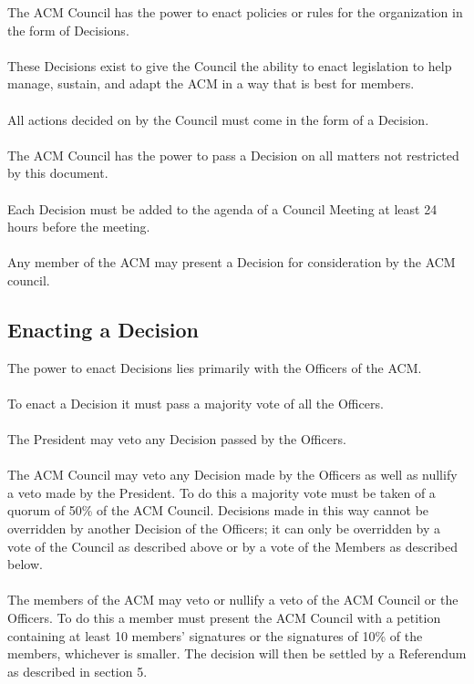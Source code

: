 \documentclass[12pt,titlepage]{article}
\begin{document}
The ACM Council has the power to enact policies or rules for the organization in the form of Decisions.\\
\\
These Decisions exist to give the Council the ability to enact legislation to help manage, sustain, and adapt the ACM in a way that is best for members.\\
\\
All actions decided on by the Council must come in the form of a Decision.\\
\\
The ACM Council has the power to pass a Decision on all matters not restricted by this document.\\
\\
Each Decision must be added to the agenda of a Council Meeting at least 24 hours before the meeting.\\
\\
Any member of the ACM may present a Decision for consideration by the ACM council.

\subsection{Enacting a Decision}

The power to enact Decisions lies primarily with the Officers of the ACM.\\
\\
To enact a Decision it must pass a majority vote of all the Officers.\\
\\
The President may veto any Decision passed by the Officers.\\
\\
The ACM Council may veto any Decision made by the Officers as well as nullify a veto made by the President. To do this a majority vote must be taken of a quorum of 50\% of the ACM Council. Decisions made in this way cannot be overridden by another Decision of the Officers; it can only be overridden by a vote of the Council as described above or by a vote of the Members as described below.\\
\\
The members of the ACM may veto or nullify a veto of the ACM Council or the Officers. To do this a member must present the ACM Council with a petition containing at least 10 members' signatures or the signatures of 10\% of the members, whichever is smaller. The decision will then be settled by a Referendum as described in section 5.
\end{document}
